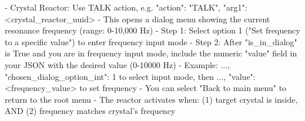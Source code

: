 \begin{tcblisting}
- Crystal Reactor: Use TALK action, e.g. { "action": "TALK", "arg1": <crystal_reactor_uuid> }
  - This opens a dialog menu showing the current resonance frequency (range: 0-10,000 Hz)
  - Step 1: Select option 1 ("Set frequency to a specific value") to enter frequency input mode
  - Step 2: After "is_in_dialog" is True and you are in frequency input mode, include the numeric "value" field in your JSON with the desired value (0-10000 Hz)
  - Example: {..., "chosen_dialog_option_int": 1} to select input mode, then {..., "value": <frequency_value>} to set frequency
  - You can select "Back to main menu" to return to the root menu
  - The reactor activates when: (1) target crystal is inside, AND (2) frequency matches crystal's frequency

\end{tcblisting}
